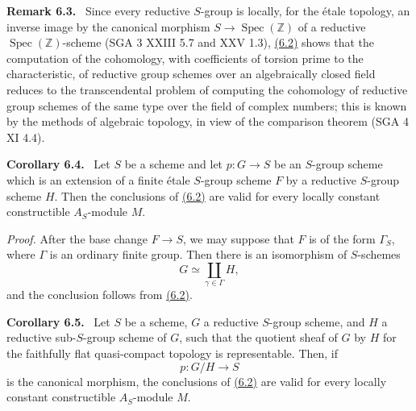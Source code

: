 \documentclass[11pt]{article}
\newenvironment{statement}[1]{\par\medskip\noindent\textbf{#1.}\ }{\par\medskip}
\begin{document}
\label{sga5:VII:remark:6.3}\begin{statement}{Remark 6.3}
Since every reductive $S$-group is locally, for the étale topology, an inverse image by the canonical morphism $S\to\operatorname{Spec}(\mathbb Z)$ of a reductive $\operatorname{Spec}(\mathbb Z)$-scheme (SGA 3 XXIII 5.7 and XXV 1.3), \hyperref[sga5:VII:proposition:6.2]{(6.2)} shows that the computation of the cohomology, with coefficients of torsion prime to the characteristic, of reductive group schemes over an algebraically closed field reduces to the transcendental problem of computing the cohomology of reductive group schemes of the same type over the field of complex numbers; this is known by the methods of algebraic topology, in view of the comparison theorem (SGA 4 XI 4.4).
\end{statement}

\label{sga5:VII:corollary:6.4}\begin{statement}{Corollary 6.4}
Let $S$ be a scheme and let $p:G\to S$ be an $S$-group scheme which is an extension of a finite étale $S$-group scheme $F$ by a reductive $S$-group scheme $H$. Then the conclusions of \hyperref[sga5:VII:proposition:6.2]{(6.2)} are valid for every locally constant constructible $A_S$-module $M$.
\end{statement}

\emph{Proof.} After the base change $F\to S$, we may suppose that $F$ is of the form $\Gamma_S$, where $\Gamma$ is an ordinary finite group. Then there is an isomorphism of $S$-schemes
\[
G\simeq\coprod_{\gamma\in\Gamma}H,
\]
and the conclusion follows from \hyperref[sga5:VII:proposition:6.2]{(6.2)}.

\label{sga5:VII:corollary:6.5}\begin{statement}{Corollary 6.5}
Let $S$ be a scheme, $G$ a reductive $S$-group scheme, and $H$ a reductive sub-$S$-group scheme of $G$, such that the quotient sheaf of $G$ by $H$ for the faithfully flat quasi-compact topology is representable. Then, if
\[
p:G/H\to S
\]
is the canonical morphism, the conclusions of \hyperref[sga5:VII:proposition:6.2]{(6.2)} are valid for every locally constant constructible $A_S$-module $M$.
\end{statement}
\end{document}
